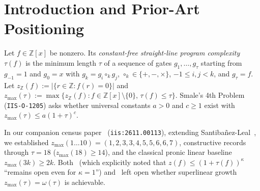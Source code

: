 \documentclass[11pt]{article}
\newcommand{\Z}{\mathbb{Z}}
\newcommand{\code}[1]{\texttt{#1}}
\newcommand{\zmax}{z_{\max}}
\newcommand{\zZ}{z_{\Z}}
\begin{document}
\begin{abstract}
\begin{enumerate}[label=(\arabic*),leftmargin=1.8em]
\end{enumerate}
Finally, we analyze why beating $c = 2$ (or resolving \code{IIS-O-1205} in full) remains blocked in both directions, isolating the characteristic-$0$ torsion obstruction that prevents recent subexponential integer-factorial circuits (Zhang \& Xuan, October 2026) from lifting to $\Z[x]$. This work does \textbf{not} resolve the full Shub--Smale $\tau$-conjecture ($c \ge 2$) or $\mathrm{P}$ vs $\mathrm{NP}$; it was developed with AI assistance (Antigravity Harness + Gemini 4 Neon) and machine-verified in Lean~4.36.0.
\end{abstract}

\section{Introduction and Prior-Art Positioning}

Let $f \in \Z[x]$ be nonzero. Its \emph{constant-free straight-line program complexity} $\tau(f)$ is the minimum length $\tau$ of a sequence of gates $g_1, \dots, g_\tau$ starting from $g_{-1} = 1$ and $g_0 = x$ with $g_k = g_i \circ_k g_j$, $\circ_k \in \{+, -, \times\}$, $-1 \le i, j < k$, and $g_\tau = f$. Let $\zZ(f) := |\{r \in \Z : f(r) = 0\}|$ and $\zmax(\tau) := \max\{\zZ(f) : f \in \Z[x] \setminus \{0\},\, \tau(f) \le \tau\}$. Smale's 4th Problem~\cite{ShubSmale1995,Smale1998} (\code{IIS-O-1205}) asks whether universal constants $a > 0$ and $c \ge 1$ exist with $\zmax(\tau) \le a(1 + \tau)^c$.

In our companion census paper~\cite{Osprey2026Census} (\code{iis:2611.00113}), extending Santiba\~{n}ez-Leal~\cite{SantibanezLeal2026}, we established $\zmax(1 \dots 10) = (1, 2, 3, 3, 4, 5, 5, 6, 6, 7)$, constructive records through $\tau = 18$ ($\zmax(18) \ge 14$), and the classical pronic linear baseline $\zmax(3k) \ge 2k$. Both~\cite{SantibanezLeal2026} (which explicitly noted that $z(f) \le (1 + \tau(f))^\kappa$ ``remains open even for $\kappa = 1$'') and~\cite{Osprey2026Census} left open whether superlinear growth $\zmax(\tau) = \omega(\tau)$ is achievable.
\end{document}
